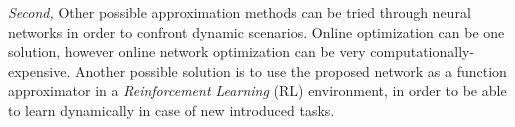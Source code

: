 \emph{Second,} Other possible approximation methods can be tried through neural networks in order to confront dynamic scenarios. Online optimization can be one solution, however online network optimization can be very computationally-expensive. Another possible solution is to use the proposed network as a function approximator in a \emph{Reinforcement Learning} (RL) environment, in order to be able to learn dynamically in case of new introduced tasks. 

